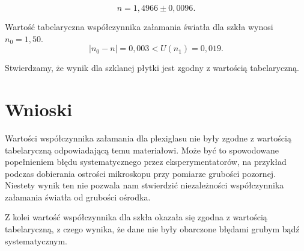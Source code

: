 \documentclass[12pt,a4paper]{article}
\numberwithin{equation}{section}
\begin{document}
\begin{equation}
	n = 1,4966 \pm 0,0096.
\end{equation}

Wartość tabelaryczna współczynnika załamania światła dla szkła wynosi $n_0 = 1,50$.
\begin{equation}
	|n_0 - n| = 0,003 < U(n_1) = 0,019.
\end{equation}

Stwierdzamy, że wynik dla szklanej płytki jest zgodny z wartością tabelaryczną.

\section{Wnioski}

Wartości współczynnika załamania dla plexiglasu nie były zgodne z wartością tabelaryczną odpowiadającą temu materiałowi. Może być to spowodowane popełnieniem błędu systematycznego przez eksperymentatorów, na przykład podczas dobierania ostrości mikroskopu przy pomiarze grubości pozornej. Niestety wynik ten nie pozwala nam stwierdzić niezależności współczynnika załamania światła od grubości ośrodka.

Z kolei wartość współczynnika dla szkła okazała się zgodna z wartością tabelaryczną, z czego wynika, że dane nie były obarczone błędami grubym bądź systematycznym.
\end{document}
